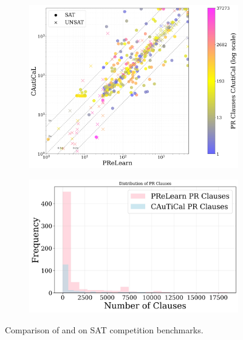   \begin{figure}[!ht]
    \centering
    \begin{subfigure}[t]{0.45\textwidth}
        \centering
        \includegraphics[width=\textwidth]{figs/prelearn_vs_cautical_nontrivial.jpg}
        \label{subfig:cautical-vs-prelearn-performance}
    \end{subfigure}
    \hspace{0.06\textwidth}
    \begin{subfigure}[t]{0.45\textwidth}
        \centering
        \includegraphics[width=\textwidth]{figs/clauses_histogram.jpg}
        \label{subfig:cautical-vs-prelearn-histogram}
    \end{subfigure}
    \caption{Comparison of \tool and \prelearn on SAT competition benchmarks.}
    \label{fig:solver-comparison-cautical-prelearn-satcomp}
\end{figure}





